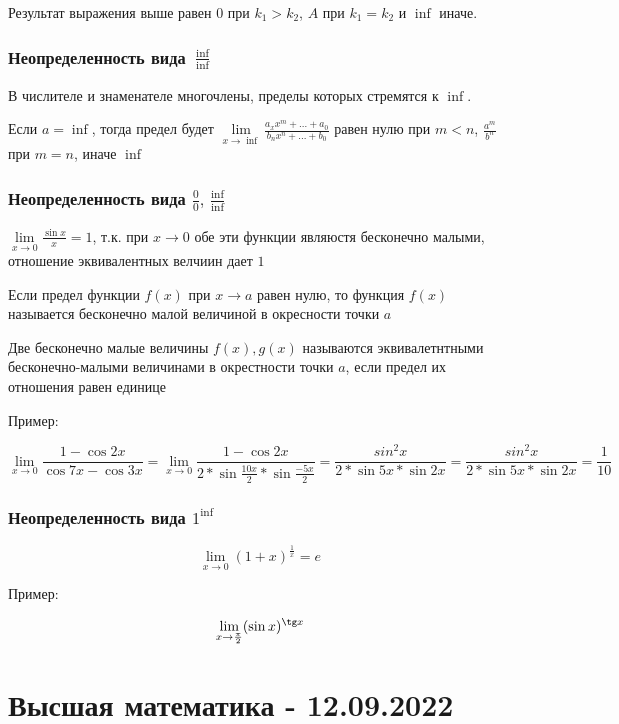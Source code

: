 \documentclass{article}
\begin{document}
Результат выражения выше равен $0$ при $k_1 > k_2$, $A$ при $k_1 = k_2$ и $\inf$ иначе.  

\subsubsection{Неопределенность вида $\frac{\inf}{\inf}$}

В числителе и знаменателе многочлены, пределы которых стремятся к $\inf$.

Если $a = \inf$, тогда предел будет $\lim\limits_{x \to \inf} \frac{a_{x}x^{m} + ... + a_0}{b_{n}x^{n} + ... + b_0}$ равен нулю при $m < n$, $\frac{a^m}{b^n}$при $m = n$, иначе $\inf$

\subsubsection{Неопределенность вида $\frac{0}{0}, \frac{\inf}{\inf}$}

$\lim\limits_{x \to 0} \frac{\sin{x}}{x} = 1$, т.к. при $x \to 0$ обе эти функции являюстя бесконечно малыми, отношение эквивалентных велчиин дает $1$

Если предел функции $f(x)$ при $x \to a$ равен нулю, то функция $f(x)$ называется бесконечно малой величиной в окресности точки $a$

Две бесконечно малые величины $f(x), g(x)$ называются эквивалетнтными бесконечно-малыми величинами в окрестности точки $a$, если предел их отношения равен единице

Пример:

$$
\lim\limits_{x \to 0} \frac{1 - \cos{2x}}{\cos 7x - \cos 3x} = \lim\limits_{x \to 0} \frac{1 - \cos{2x}}{2 * \sin{\frac{10x}{2}} * \sin{\frac{-5x}{2}}} = \frac{sin^2{x}}{2 * \sin{5x} * \sin{2x}} = \frac{sin^2{x}}{2 * \sin{5x} * \sin{2x}} = \frac{1}{10}
$$

\subsubsection{Неопределенность вида $1^{\inf}$}

$$\lim\limits_{x \to 0} (1 + x)^{\frac{1}{x}} = e$$

Пример:

$$
\lim\limits_{x \to \frac{\pi}{2}} (\sin x)^{\tg x}
$$

\pagebreak

\section{Высшая математика - 12.09.2022}
\end{document}
